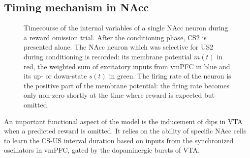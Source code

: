 \documentclass[
  11pt,
  a4paper,
]{scrbook}
\begin{document}
\subsection{Timing mechanism in NAcc}\label{timing-mechanism-in-nacc}

\begin{figure}


\caption{\label{fig-finr:nacc_omission}Timecourse of the internal
variables of a single NAcc neuron during a reward omission trial. After
the conditioning phase, CS2 is presented alone. The NAcc neuron which
was selective for US2 during conditioning is recorded: its membrane
potential \(m(t)\) in red, the weighted sum of excitatory inputs from
vmPFC in blue and its up- or down-state \(s(t)\) in green. The firing
rate of the neuron is the positive part of the membrane potential: the
firing rate becomes only non-zero shortly at the time where reward is
expected but omitted.}

\end{figure}%

An important functional aspect of the model is the inducement of dips in
VTA when a predicted reward is omitted. It relies on the ability of
specific NAcc cells to learn the CS-US interval duration based on inputs
from the synchronized oscillators in vmPFC, gated by the dopaminergic
bursts of VTA.
\end{document}
